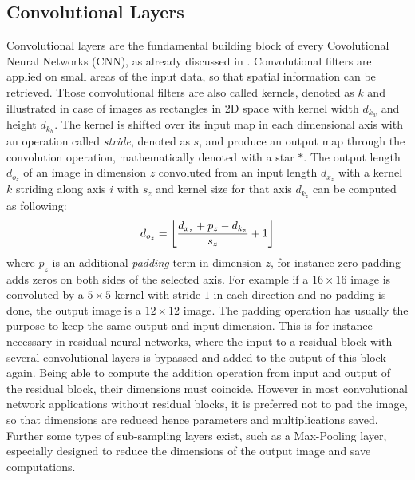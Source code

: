 \subsection{Convolutional Layers}\label{sec:nn_theory_cnn}
Convolutional layers are the fundamental building block of every Covolutional Neural Networks (CNN), as already discussed in .
Convolutional filters are applied on small areas of the input data, so that spatial information can be retrieved.
Those convolutional filters are also called kernels, denoted as $k$ and illustrated in case of images as rectangles in 2D space with kernel width $d_{k_w}$ and height $d_{k_h}$.
The kernel is shifted over its input map in each dimensional axis with an operation called \emph{stride}, denoted as $s$, and produce an output map through the convolution operation, mathematically denoted with a star $*$.
The output length $d_{o_z}$ of an image in dimension $z$ convoluted from an input length $d_{x_z}$ with a kernel $k$ striding along axis $i$ with $s_z$ and kernel size for that axis $d_{k_z}$ can be computed as following:
\begin{equation}\label{eq:nn_theory_cnn_}
  d_{o_z} = \floor*{\frac{d_{x_z} + p_z - d_{k_z}}{s_z} + 1}
\end{equation}
where $p_z$ is an additional \emph{padding} term in dimension $z$, for instance zero-padding adds zeros on both sides of the selected axis.
For example if a $16 \times 16$ image is convoluted by a $5 \times 5$ kernel with stride $1$ in each direction and no padding is done, the output image is a $12 \times 12$ image.
The padding operation has usually the purpose to keep the same output and input dimension.
This is for instance necessary in residual neural networks, where the input to a residual block with several convolutional layers is bypassed and added to the output of this block again.
Being able to compute the addition operation from input and output of the residual block, their dimensions must coincide.
However in most convolutional network applications without residual blocks, it is preferred not to pad the image, so that dimensions are reduced hence parameters and multiplications saved.
Further some types of sub-sampling layers exist, such as a Max-Pooling layer, especially designed to reduce the dimensions of the output image and save computations.

